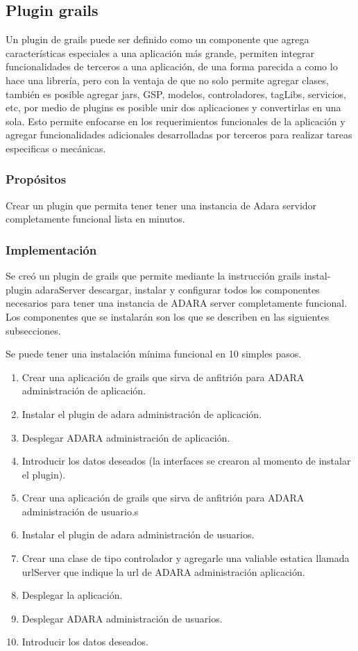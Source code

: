 \documentclass[12pt,a4paper,spanish,openany]{book}
\begin{document}
\subsection{Plugin grails}
Un plugin de grails puede ser definido como un componente que agrega
características especiales a una aplicación más grande, permiten integrar
funcionalidades de terceros a una aplicación, de  una forma parecida a como lo
hace una librería, pero con la ventaja de que no solo permite agregar clases,
también es posible agregar jars, GSP, modelos, controladores, tagLibs,
servicios, etc, por medio de plugins es posible  unir dos aplicaciones y
convertirlas en una sola. Esto permite enfocarse en los requerimientos
funcionales de la aplicación y agregar funcionalidades adicionales
desarrolladas por terceros para realizar tareas especificas o mecánicas.

\subsubsection{Propósitos}
Crear un plugin que permita tener tener una instancia de Adara servidor
completamente funcional lista en minutos.

\subsubsection{Implementación}
Se creó un plugin de grails que permite mediante la instrucción grails
instal-plugin adaraServer descargar, instalar y configurar todos los componentes
necesarios para tener una instancia de ADARA server completamente funcional.
Los componentes que se instalarán son los que se describen en las siguientes
subsecciones.

Se puede tener una instalación mínima funcional en 10 simples pasos.

\begin{enumerate}
  \item Crear una aplicación de grails que sirva de anfitrión para ADARA
  administración de aplicación.
  \item Instalar el plugin de adara administración de aplicación.
  \item Desplegar  ADARA administración de aplicación.
  \item Introducir los datos deseados (la interfaces se crearon al momento de
  instalar el plugin).
  \item Crear una aplicación de grails que sirva de anfitrión para ADARA
  administración de usuario.s
  \item Instalar el plugin de adara administración de usuarios.
  \item Crear una clase de tipo controlador y agregarle una valiable estatica
  llamada urlServer que indique la url de ADARA administración aplicación.
  \item Desplegar la aplicación.
  \item Desplegar  ADARA administración de usuarios.
  \item Introducir los datos deseados.
\end{enumerate}
\end{document}
